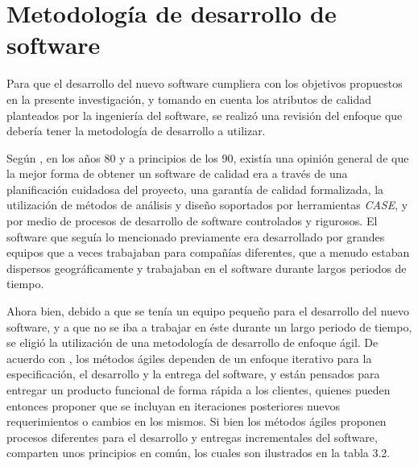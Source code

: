 \vspace*{0.5 cm}

	\section{Metodolog\'{i}a de desarrollo de software}
Para que el desarrollo del nuevo software cumpliera con los objetivos propuestos en la presente investigaci\'{o}n, y tomando en cuenta los atributos de calidad planteados por la ingenier\'{i}a del software, se realiz\'{o} una revisi\'{o}n del enfoque que deber\'{i}a tener la metodolog\'{i}a de desarrollo a utilizar.

Seg\'{u}n \cite{Sommerville}, en los a\~{n}os 80 y a principios de los 90, exist\'{i}a una opini\'{o}n general de que la mejor forma de obtener un software de calidad era a trav\'{e}s de una planificaci\'{o}n cuidadosa del proyecto, una garant\'{i}a de calidad formalizada, la utilizaci\'{o}n de m\'{e}todos de an\'{a}lisis y dise\~{n}o soportados por herramientas \textit{CASE}, y por medio de procesos de desarrollo de software controlados y rigurosos. El software que segu\'{i}a lo mencionado previamente era desarrollado por grandes equipos que a veces trabajaban para compa\~{n}\'{i}as diferentes, que a menudo estaban dispersos geogr\'{a}ficamente y trabajaban en el software durante largos periodos de tiempo.

Ahora bien, debido a que se ten\'{i}a un equipo peque\~{n}o para el desarrollo del nuevo software, y a que no se iba a trabajar en \'{e}ste durante un largo periodo de tiempo, se eligi\'{o} la utilizaci\'{o}n de una metodolog\'{i}a de desarrollo de enfoque \'{a}gil. De acuerdo con \cite{Sommerville}, los m\'{e}todos \'{a}giles dependen de un enfoque iterativo para la especificaci\'{o}n, el desarrollo y la entrega del software, y est\'{a}n pensados para entregar un producto funcional de forma r\'{a}pida a los clientes, quienes pueden entonces proponer que se incluyan en iteraciones posteriores nuevos requerimientos o cambios en los mismos. Si bien los m\'{e}todos \'{a}giles proponen procesos diferentes para el desarrollo y entregas incrementales del software, comparten unos principios en com\'{u}n, los cuales son ilustrados en la tabla 3.2.

